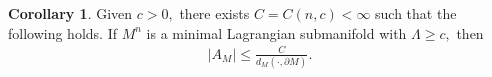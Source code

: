 \documentclass[11pt]{amsart}
\numberwithin{equation}{section}
\theoremstyle{definition}
\newtheorem{thm}[equation]{Theorem} %
\theoremstyle{definition}
\newtheorem{cor}[equation]{Corollary}
\newcommand{\ovl}[1]{\overline{#1}}
\newcommand{\bb}[1]{\mathbb{#1}} \newcommand{\td}[1]{\widetilde{#1}}
\newcommand{\n}{\nabla}
\newcommand{\bd}{\partial}
\begin{document}
\begin{cor}
\label{cor:local-curv-est}
	Given $c>0,$ there exists $C=C(n,c)<\infty$ such that the following holds.
	If $M^n$ is a minimal Lagrangian submanifold with $\Lambda\ge c,$ then 
	\begin{align*}
	|A_M|\le \frac C{d_M(\cdot,\bd M)}.
	\end{align*} 
\end{cor}











\end{document}
